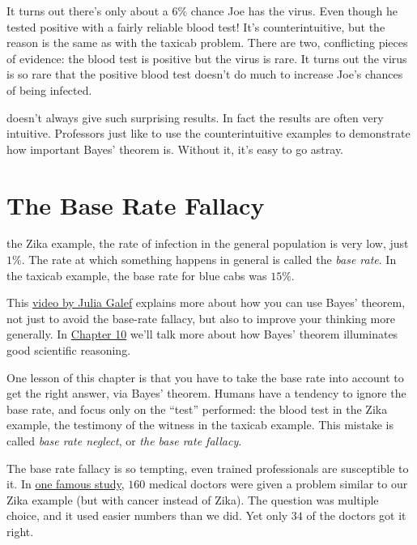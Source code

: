 \documentclass[justified]{tufte-book}
\theoremstyle{definition}
\theoremstyle{definition}
\theoremstyle{definition}
\theoremstyle{remark}
\begin{document}
It turns out there's only about a \(6\%\) chance Joe has the virus. Even though he tested positive with a fairly reliable blood test! It's counterintuitive, but the reason is the same as with the taxicab problem. There are two, conflicting pieces of evidence: the blood test is positive but the virus is rare. It turns out the virus is so rare that the positive blood test doesn't do much to increase Joe's chances of being infected.

 doesn't always give such surprising results. In fact the results are often very intuitive. Professors just like to use the counterintuitive examples to demonstrate how important Bayes' theorem is. Without it, it's easy to go astray.

\hypertarget{baserate}{%
\section{The Base Rate Fallacy}\label{baserate}}

 the Zika example, the rate of infection in the general population is very low, just \(1\%\). The rate at which something happens in general is called the \emph{base rate}. In the taxicab example, the base rate for blue cabs was \(15\%\).

\begin{marginfigure}
This \href{https://www.youtube.com/watch?v=BrK7X_XlGB8}{video by Julia
Galef} explains more about how you can use Bayes' theorem, not just to
avoid the base-rate fallacy, but also to improve your thinking more
generally. In \protect\hyperlink{bayesibe}{Chapter 10} we'll talk more
about how Bayes' theorem illuminates good scientific reasoning.
\end{marginfigure}

One lesson of this chapter is that you have to take the base rate into account to get the right answer, via Bayes' theorem. Humans have a tendency to ignore the base rate, and focus only on the ``test'' performed: the blood test in the Zika example, the testimony of the witness in the taxicab example. This mistake is called \emph{base rate neglect}, or \emph{the base rate fallacy}.

The base rate fallacy is so tempting, even trained professionals are susceptible to it. In \href{https://www.stat.berkeley.edu/~aldous/157/Papers/health_stats.pdf}{one famous study}, \(160\) medical doctors were given a problem similar to our Zika example (but with cancer instead of Zika). The question was multiple choice, and it used easier numbers than we did. Yet only \(34\) of the doctors got it right.
\end{document}
